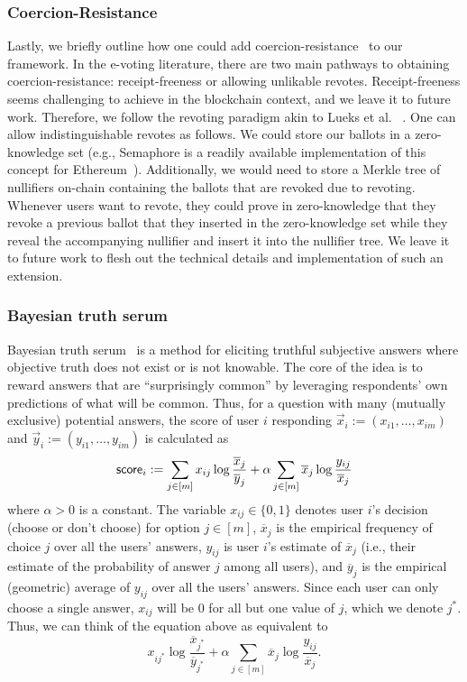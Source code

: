 \subsubsection{Coercion-Resistance}\label{sec:extension_coercion_resistance}
Lastly, we briefly outline how one could add coercion-resistance~\cite{WPES:JueCatJak05} to our framework. In the e-voting literature, there are two main pathways to obtaining coercion-resistance: receipt-freeness or allowing unlikable revotes. Receipt-freeness seems challenging to achieve in the blockchain context, and we leave it to future work.  Therefore, we follow the revoting paradigm akin to Lueks et al. ~\cite{USENIX:LueQueTro20}. One can allow indistinguishable revotes as follows. We could store our ballots in a zero-knowledge set (e.g., Semaphore is a readily available implementation of this concept for Ethereum~\cite{semaphore}). Additionally, we would need to store a Merkle tree of nullifiers on-chain containing the ballots that are revoked due to revoting. Whenever users want to revote, they could prove in zero-knowledge that they revoke a previous ballot that they inserted in the zero-knowledge set while they reveal the accompanying nullifier and insert it into the nullifier tree. We leave it to future work to flesh out the technical details and implementation of such an extension.

\subsubsection{Bayesian truth serum}\label{sec:bayesian_truth}

Bayesian truth serum~\cite{Prelec04} is a method for eliciting truthful subjective answers where objective truth does not exist or is not knowable. The core of the idea is to reward answers that are ``surprisingly common'' by leveraging respondents' own predictions of what will be common. Thus, for a question with many (mutually exclusive) potential answers, the score of user $i$ responding $\vec{x}_i := (x_{i1}, \dots, x_{im})$ and $\vec{y}_i := (y_{i1}, \dots, y_{im})$ is calculated as
%
\begin{equation}\label{eqn:bts}
    {\sf score}_i := \sum_{j \in [m]} x_{ij} \log{\frac{\overline{x}_j}{\overline{y}_j}} + \alpha \sum_{j \in [m]} \overline{x}_j \log{\frac{y_{ij}}{\overline{x}_j}}
\end{equation}
%
where $\alpha > 0$ is a constant. The variable $x_{ij} \in \{0,1\}$ denotes user $i$'s decision (choose or don't choose) for option $j \in [m]$, $\overline{x}_j$ is the empirical frequency of choice $j$ over all the users' answers, $y_{ij}$ is user $i$'s estimate of $\overline{x}_j$ (i.e., their estimate of the probability of answer $j$ among all users), and $\overline{y}_j$ is the empirical (geometric) average of $y_{ij}$ over all the users' answers. Since each user can only choose a single answer, $x_{ij}$ will be 0 for all but one value of $j$, which we denote $j^*$. Thus, we can think of the equation above as equivalent to
%
\[
    x_{ij^*} \log{\frac{\overline{x}_{j^*}}{\overline{y}_{j^*}}} + \alpha \sum_{j \in [m]} \overline{x}_j \log{\frac{y_{ij}}{\overline{x}_j}}.
\]

